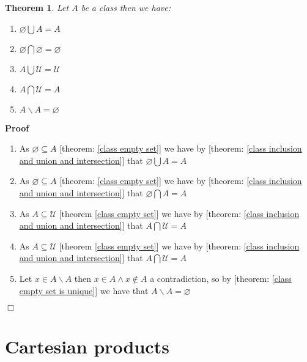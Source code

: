 \documentclass{book}
\newcommand{\nin}{\not\in}
\newenvironment{proof}{\noindent\textbf{Proof\ }}{\hspace*{\fill}$\Box$\medskip}
\newtheorem{theorem}{Theorem}
\begin{document}
\begin{theorem}
  \label{class universal and empotyset properties}Let $A$ be a class then we
  have:
  \begin{enumerate}
    \item $\varnothing \bigcup A = A$
    
    \item $\varnothing \bigcap \varnothing = \varnothing$
    
    \item $A \bigcup \mathcal{U}=\mathcal{U}$
    
    \item $A \bigcap \mathcal{U}= A$
    
    \item $A\backslash A = \varnothing$
  \end{enumerate}
\end{theorem}

\begin{proof}
  
  \begin{enumerate}
    \item As $\varnothing \subseteq A$ [theorem: \ref{class empty set}] we
    have by [theorem: \ref{class inclusion and union and intersection}] that
    $\varnothing \bigcup A = A$
    
    \item As $\varnothing \subseteq A$ [theorem: \ref{class empty set}] we
    have by [theorem: \ref{class inclusion and union and intersection}] that
    $\varnothing \bigcap A = A$
    
    \item As $A \subseteq \mathcal{U}$ [theorem \ref{class empty set}] we have
    by [theorem: \ref{class inclusion and union and intersection}] that $A
    \bigcap \mathcal{U}= A$
    
    \item As $A \subseteq \mathcal{U}$ [theorem \ref{class empty set}] we have
    by [theorem: \ref{class inclusion and union and intersection}] that $A
    \bigcap \mathcal{U}= A$
    
    \item Let $x \in A\backslash A$ then $x \in A \wedge x \nin A$ a
    contradiction, so by [theorem: \ref{class empty set is unique}] we have
    that $A\backslash A = \varnothing$
  \end{enumerate}
\end{proof}

\section{Cartesian products}
\end{document}
